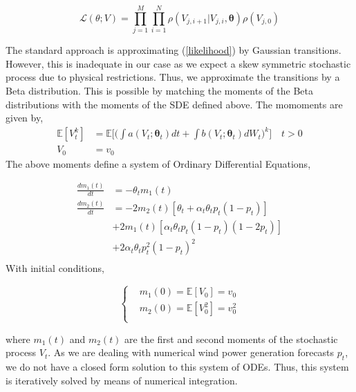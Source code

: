 \documentclass[10pt,twocolumn,letterpaper]{article}
\newcommand{\E}{\mathbb{E}}
\begin{document}
\begin{equation}
\mathcal{L}(\theta;V) =\prod\limits_{j=1}^M \prod\limits_{i=1}^N \rho ( {V_{j,i+1}|V_{j,i}}, \bm{\theta})  \rho (V_{j,0}) 
\label{likelihood}
\end{equation}

The standard approach is approximating (\ref{likelihood}) by Gaussian transitions. However, this is inadequate in our case as we expect a skew symmetric stochastic process due to physical restrictions. Thus, we approximate the transitions by a Beta distribution. This is possible by matching the moments of the Beta distributions with the moments of the SDE defined above. The momoments are given by, 
\begin{equation}
\begin{split}
\E [V_t^k] &=  \E \Big[ \Big( \int a(V_t; \bm{\theta}_t) dt + \int b (V_t; \bm{\theta}_t ) dW_t \Big)^k \Big] \quad t > 0 \\
V_0 & = v_0
\end{split}\label{main_V_expectations}
\end{equation}
The above moments define a system of Ordinary Differential Equations,

\begin{equation}
\begin{split}
 \frac{dm_1(t)}{dt} &=    - \theta_t m_1(t)  \\
\frac{d m_{2}(t)}{dt}&= -2m_{2}(t) [\theta_t + \alpha_t \theta_t p_t(1-p_t) ] \\
&+ 2m_{1}(t)[\alpha_t \theta_t p_t (1-p_t) (1-2p_t)] \\
&+ 2\alpha_t \theta_t p_t^2(1-p_t)^2  \\
\end{split}
\end{equation}
With initial conditions,

\begin{equation}
\begin{cases}
&m_1(0)=\E[V_0]= v_0 \\
&m_2(0)=\E[V_0^2] = v_0^2 \\
\end{cases}
\end{equation}

where $m_1(t)$ and $m_2(t)$ are the first and second moments of the stochastic process $V_t$. As we are dealing with numerical wind power generation forecasts $p_t$, we do not have a closed form solution to this system of ODEs. Thus, this system is iteratively solved by means of numerical integration.
\end{document}
